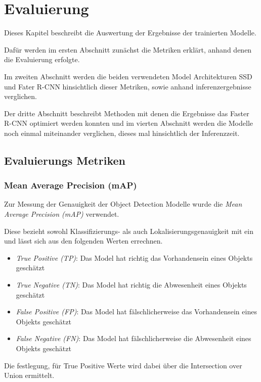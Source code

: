 \chapter{Evaluierung}\label{kap:eval}

Dieses Kapitel beschreibt die Auswertung der
Ergebnisse der trainierten Modelle.

Dafür werden im ersten Abschnitt zunächst die Metriken 
erklärt, anhand denen die Evaluierung erfolgte. 

Im zweiten Abschnitt werden die beiden verwendeten Model
Architekturen SSD und Fater R-CNN hinsichtlich dieser Metriken, sowie anhand 
inferenzergebnisse verglichen.

Der dritte Abschnitt beschreibt Methoden mit denen 
die Ergebnisse das Faster R-CNN optimiert werden konnten und im 
vierten Abschnitt werden die Modelle noch einmal miteinander
verglichen, dieses mal hinsichtlich der Inferenzzeit.

\section{Evaluierungs Metriken}\label{sec:metricen}

\subsection*{Mean Average Precision (mAP)}

Zur Messung der Genauigkeit der Object Detection Modelle 
wurde die \textit{Mean Average Precision (mAP)} verwendet.

Diese bezieht sowohl Klassifizierungs- als auch Lokalisierungsgenauigkeit 
mit ein und lässt sich aus den folgenden Werten errechnen.

\begin{itemize}
  \item \textit{True Positive (TP)}: Das Model hat richtig das Vorhandensein eines Objekts geschätzt
  \item \textit{True Negative (TN)}: Das Model hat richtig die Abwesenheit eines Objekts geschätzt
  \item \textit{False Positive (FP)}: Das Model hat fälschlicherweise das Vorhandensein eines Objekts geschätzt
  \item \textit{False Negative (FN)}: Das Model hat fälschlicherweise die Abwesenheit eines Objekts geschätzt
\end{itemize}

Die festlegung, für True Positive Werte wird dabei über die 
Intersection over Union ermittelt.

